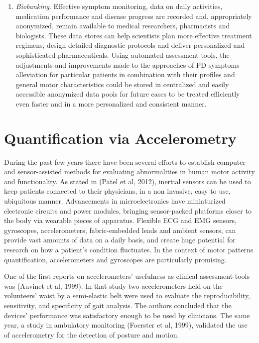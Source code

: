 \begin{enumerate}
\item \textit{Biobanking}. Effective symptom monitoring, data on daily activities, medication performance and disease progress are recorded and, appropriately anonymized, remain available to medical researchers, pharmacists and biologists. These data stores can help scientists plan more effective treatment regimens, design detailed diagnostic protocols and deliver personalized and sophisticated pharmaceuticals. Using automated assessment tools, the adjustments and improvements made to the approaches of \gls{PD} symptoms alleviation for particular patients in combination with their profiles and general motor characteristics could be stored in centralized and easily accessible anonymized data pools for future cases to be treated efficiently even faster and in a more personalized and consistent manner.
\end{enumerate}



\section{Quantification via Accelerometry}
\label{sec:accelerometry}
During the past few years there have been several efforts to establish computer and sensor-assisted methods for evaluating abnormalities in human motor activity and functionality. As stated in (Patel et al, 2012), inertial sensors can be used to keep patients connected to their physicians, in a non invasive, easy to use, ubiquitous manner. Advancements in microelectronics have miniaturized electronic circuits and power modules, bringing sensor-packed platforms closer to the body via wearable pieces of apparatus. Flexible \gls{ECG} and \gls{EMG} sensors, gyroscopes, accelerometers, fabric-embedded leads and ambient sensors, can provide vast amounts of data on a daily basis, and create huge potential for research on how a patient's condition fluctuates. In the context of motor patterns quantification, accelerometers and gyroscopes are particularly promising. 

One of the first reports on accelerometers' usefulness as clinical assessment tools was (Auvinet et al, 1999). In that study two accelerometers held on the volunteers' waist by a semi-elastic belt were used to evaluate the reproducibility, sensitivity, and specificity of gait analysis. The authors concluded that the devices' performance was satisfactory enough to be used by clinicians. The same year, a study in ambulatory monitoring (Foerster et al, 1999), validated the use of accelerometry for the detection of posture and motion. 

